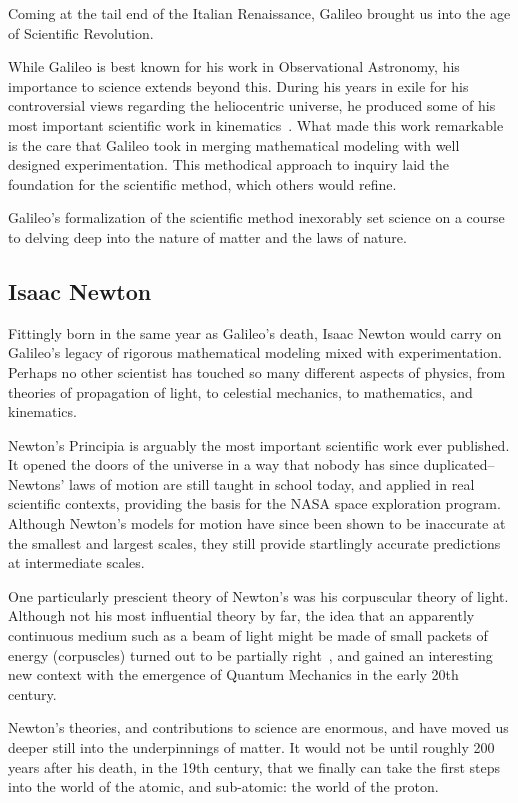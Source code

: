 Coming at the tail end of the Italian Renaissance, Galileo brought us into the
age of Scientific Revolution.

While Galileo is best known for his work in Observational Astronomy, his
importance to science extends beyond this. During his years in exile for his
controversial views regarding the heliocentric universe, he produced some of
his most important scientific work in kinematics~\cite{Hall1965}. What made
this work remarkable is the care that Galileo took in merging mathematical
modeling with well designed experimentation. This methodical approach to
inquiry laid the foundation for the scientific method, which others would
refine. 

Galileo's formalization of the scientific method inexorably set science on a
course to delving deep into the nature of matter and the laws of nature.

\subsection{Isaac Newton}

Fittingly born in the same year as Galileo's death, Isaac Newton would carry on
Galileo's legacy of rigorous mathematical modeling mixed with experimentation.
Perhaps no other scientist has touched so many different aspects of physics,
from theories of propagation of light, to celestial mechanics, to mathematics,
and kinematics.

Newton's Principia is arguably the most important scientific work ever
published.  It opened the doors of the universe in a way that nobody has since
duplicated--Newtons' laws of motion are still taught in school today, and
applied in real scientific contexts, providing the basis for the NASA space
exploration program. Although Newton's models for motion have since been shown
to be inaccurate at the smallest and largest scales, they still provide
startlingly accurate predictions at intermediate scales.

One particularly prescient theory of Newton's was his corpuscular theory of
light. Although not his most influential theory by far, the idea that an
apparently continuous medium such as a beam of light might be made of small
packets of energy (corpuscles) turned out to be partially
right~\cite{Stuewer1970}, and gained an interesting new context with the
emergence of Quantum Mechanics in the early 20th century.

Newton's theories, and contributions to science are enormous, and have moved us
deeper still into the underpinnings of matter. It would not be until roughly 200
years after his death, in the 19th century, that we finally can take the first
steps into the world of the atomic, and sub-atomic: the world of the proton. 

